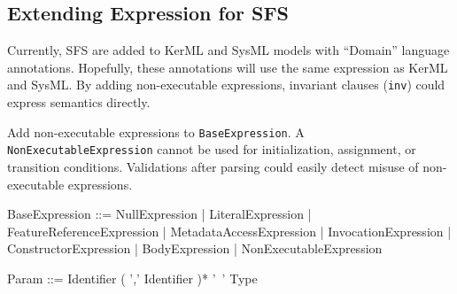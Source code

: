 \subsection{Extending Expression for SFS}\label{sec:extendingexpression}

\pn Currently, SFS are added to KerML and SysML models with ``Domain'' language annotations.
Hopefully, these annotations will use the same expression as KerML and SysML.
By adding non-executable expressions, invariant clauses (\texttt{inv}) could express semantics directly.

\pn Add non-executable expressions to \texttt{BaseExpression}.
A \texttt{NonExecutableExpression} cannot be used for initialization, assignment, or transition conditions.
Validations after parsing could easily detect misuse of non-executable expressions.

\begin{bnf}
BaseExpression ::=
  NullExpression
  | LiteralExpression
  | FeatureReferenceExpression
  | MetadataAccessExpression
  | InvocationExpression
  | ConstructorExpression
  | BodyExpression
  | {\color{orange}NonExecutableExpression}
\end{bnf}

\begin{bnf}
Param ::= Identifier ( ',' Identifier )* '~' Type
\end{bnf}

